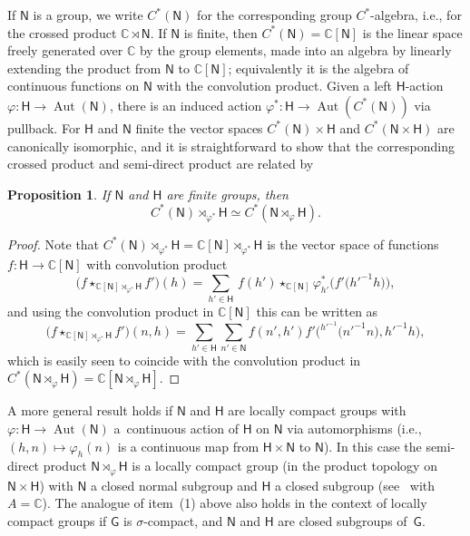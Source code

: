 \documentclass[10pt,a4paper]{amsart}
\numberwithin{equation}{section}
\newcommand{\sfG}{\mathsf{G}}
\newcommand{\sfH}{\mathsf{H}}
\newcommand{\sfN}{\mathsf{N}}
\newcommand{\Aut}{\operatorname{Aut}}
\newcommand{\complex}{{\mathbb C}} %
\newtheorem{Proposition}[Theorem]{Proposition}
 { \theoremstyle{definition}
\newtheorem{Definition}[Theorem]{Definition}
\newtheorem{Note}[Theorem]{Note}
\newtheorem{Example}[Theorem]{Example}
\newtheorem{Remark}[Theorem]{Remark} }
\begin{document}
If $\sfN $ is a group, we write $C^*(\sfN )$ for the corresponding group
$C^*$-algebra, i.e., for the crossed product $\complex\rtimes \sfN $. If
$\sfN $ is finite, then $C^*(\sfN )=\complex[\sfN ]$ is the linear space
freely generated over $\complex$ by the group elements, made into an algebra by
linearly extending the product from $\sfN $ to $\complex[\sfN ]$; equivalently
it is the algebra of continuous functions
on $\sfN $ with the convolution product.
 Given a
left $\sfH $-action $\varphi\colon \sfH \to\Aut(\sfN )$, there is an induced action
$\varphi^*\colon \sfH \to \Aut(C^*(\sfN ))$ via pullback. For $\sfH $ and $\sfN $ finite the
vector spaces $ C^*(\sfN )\times \sfH $ and $C^*(\sfN \times \sfH )$ are canonically
isomorphic, and it is straightforward
to show that the corresponding crossed product and semi-direct product are
related by
\begin{Proposition}\label{cpsp}
If $\sfN$ and $\sfH$ are finite groups, then
\[
C^*(\sfN )\rtimes_{\varphi^*}\sfH \simeq C^*(\sfN \rtimes_\varphi \sfH ) .
\]
\end{Proposition}
\begin{proof} Note that $C^*(\sfN )\rtimes_{\varphi^*}\sfH =\complex[\sfN ]\rtimes_{\varphi^*}\sfH $ is the
 vector space of functions $f\colon \sfH \to \complex[\sfN ]$ with convolution product
\[
\big(f\star_{\complex[\sfN ]\rtimes_{\varphi^*}\sfH } f'\big)(h)=\sum_{h'\in
 \sfH }\,f(h')\star_{\complex[\sfN ]}\varphi^*_{h'}\big(f'\big(h'^{-1} h\big)\big) ,
\]
and using the convolution product in $\complex[\sfN]$ this can be
written as
\[
\big(f\star_{\complex[\sfN ]\rtimes_{\varphi^*}\sfH }
f'\big)(n,h)=\sum_{h'\in \sfH} \sum_{n'\in
 \sfN } f(n',h') f'\big({}^{h'^{-1\!}}\big(n'^{-1} n\big),h'^{-1} h\big) ,
\]
which is easily seen
 to coincide with the convolution product in $ C^*(\sfN \rtimes_\varphi \sfH )=\complex[\sfN \rtimes_\varphi \sfH ]$.
\end{proof}

A more general result holds if $\sfN $ and $\sfH $ are locally compact groups with $\varphi\colon \sfH \to \Aut (\sfN )$
a~continuous action of $\sfH $ on $\sfN $ via automorphisms
(i.e., $(h,n)\mapsto \varphi_h(n)$ is a continuous map from $\sfH \times \sfN $ to $\sfN $).
In this case the semi-direct product $\sfN \rtimes_\varphi \sfH $ is a locally compact
group (in the product topology on $\sfN \times \sfH $) with $\sfN $ a closed normal subgroup and $\sfH $ a closed
subgroup (see~\cite[Proposition~3.11]{Williams2007} with
$A=\complex$). The analogue of item~(1) above also holds in the
context of locally compact groups if $\sfG$ is $\sigma$-compact, and
$\sfN$ and $\sfH$ are closed subgroups of~$\sfG$.
\end{document}
